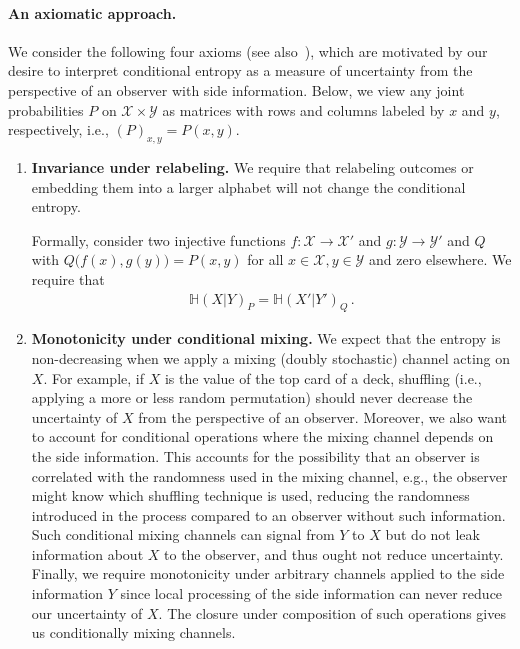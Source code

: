 \documentclass[aps,pra,11pt,onecolumn,nofootinbib,tightenlines]{revtex4-2}
\theoremstyle{definition}
\renewcommand{\H}{\mathbb{H}}
\newcommand{\mc}[1]{\mathcal{#1}}
\begin{document}
\paragraph*{An axiomatic approach.}
We consider the following four axioms (see also~\cite{gour2018conditional,gour2024inevitability}), which are motivated by our desire to interpret conditional entropy as a measure of uncertainty from the perspective of an observer with side information. Below, we view any joint probabilities $P$ on $\mc{X}\times\mc Y$ as matrices with rows and columns labeled by $x$ and $y$, respectively, i.e.,
$(P)_{x,y} = P(x,y)$.
\begin{enumerate}
    \item \textbf{Invariance under relabeling.} We require that relabeling outcomes or embedding them into a larger alphabet will not change the conditional entropy. 

    \smallskip
    
    Formally, consider two injective functions $f: \mc{X} \to \mc{X}'$ and $g: \mc{Y} \to \mc{Y}'$ and $Q$ with $Q\big(f(x),g(y)\big) = P(x,y)$ for all $x \in \mc{X}, y \in \mc{Y}$ and zero elsewhere. We require that
    \begin{align}
        \H(X|Y)_P = \H(X'|Y')_Q \,.
    \end{align}

\label{it: relabeling and embedding}
    \item \textbf{Monotonicity under conditional mixing.} We expect that the entropy is non-decreasing when we apply a mixing (doubly stochastic) channel acting on $X$. For example, if $X$ is the value of the top card of a deck, shuffling (i.e., applying a more or less random permutation) should never decrease the uncertainty of $X$ from the perspective of an observer.
    Moreover, we also want to account for conditional operations where the mixing channel depends on the side information. This accounts for the possibility that an observer is correlated with the randomness used in the mixing channel, e.g., the observer might know which shuffling technique is used, reducing the randomness introduced in the process compared to an observer without such information. Such conditional mixing channels can signal from $Y$ to $X$ but do not leak information about $X$ to the observer, and thus ought not reduce uncertainty.
    Finally, we require monotonicity under arbitrary channels applied to the side information $Y$ since local processing of the side information can never reduce our uncertainty of $X$.
    The closure under composition of such operations gives us conditionally mixing channels.


\end{enumerate}
\end{document}
